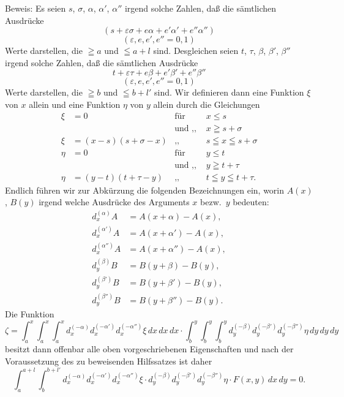 \documentclass{article}
\begin{document}
Beweis: Es seien $s$, $\sigma$, $\alpha$, $\alpha'$, $\alpha''$ irgend solche Zahlen, daß die sämtlichen Ausdrücke
\[
(s + \varepsilon\sigma + e\alpha + e'\alpha' + e''\alpha'')
\]
\[
(\varepsilon, e, e', e'' = 0, 1)
\]
Werte darstellen, die $\geqq a$ und $\leqq a+l$ sind. Desgleichen seien $t$, $\tau$, $\beta$, $\beta'$, $\beta''$ irgend solche Zahlen, daß die sämtlichen Ausdrücke
\[
t + \varepsilon\tau + e\beta + e'\beta' + e''\beta''
\]
\[
(\varepsilon, e, e', e'' = 0, 1)
\]
Werte darstellen, die $\geqq b$ und $\leqq b+l'$ sind. Wir definieren dann eine Funktion $\xi$ von $x$ allein und eine Funktion $\eta$ von $y$ allein durch die Gleichungen
\[
\begin{aligned}
\xi &= 0 & \text{für } & x \le s \\
& & \text{und ,, } & x \geqq s + \sigma \\
\xi &= (x-s)(s+\sigma-x) & \text{,, } & s \leqq x \leqq s + \sigma \\
\eta &= 0 & \text{für } & y \le t \\
& & \text{und ,, } & y \geqq t + \tau \\
\eta &= (y-t)(t+\tau-y) & \text{,, } & t \leqq y \leqq t + \tau.
\end{aligned}
\]
Endlich führen wir zur Abkürzung die folgenden Bezeichnungen ein, worin $A(x)$, $B(y)$ irgend welche Ausdrücke des Arguments $x$ bezw.\ $y$ bedeuten:
\[
\begin{aligned}
d_x^{(\alpha)} A &= A(x+\alpha) - A(x), \\
d_x^{(\alpha')} A &= A(x+\alpha') - A(x), \\
d_x^{(\alpha'')} A &= A(x+\alpha'') - A(x), \\
d_y^{(\beta)} B &= B(y+\beta) - B(y), \\
d_y^{(\beta')} B &= B(y+\beta') - B(y), \\
d_y^{(\beta'')} B &= B(y+\beta'') - B(y).
\end{aligned}
\]
Die Funktion
\[
\zeta = \int_a^x \int_a^x \int_a^x d_x^{(-\alpha)} d_x^{(-\alpha')} d_x^{(-\alpha'')} \xi\,dx\,dx\,dx \cdot \int_b^y \int_b^y \int_b^y d_y^{(-\beta)} d_y^{(-\beta')} d_y^{(-\beta'')} \eta\,dy\,dy\,dy
\]
besitzt dann offenbar alle oben vorgeschriebenen Eigenschaften und nach der Voraussetzung des zu beweisenden Hilfssatzes ist daher
\[
\int_a^{a+l} \int_b^{b+l'} d_x^{(-\alpha)} d_x^{(-\alpha')} d_x^{(-\alpha'')} \xi \cdot d_y^{(-\beta)} d_y^{(-\beta')} d_y^{(-\beta'')} \eta \cdot F(x, y)\,dx\,dy = 0.
\]
\end{document}
